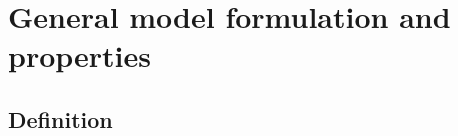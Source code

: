 \documentclass{article}
\begin{document}


\section{General model formulation and properties}
\label{sec:general_definition}

\subsection{Definition}
\end{document}
